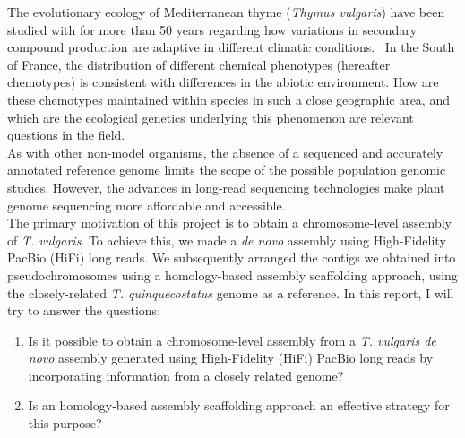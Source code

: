 The evolutionary ecology of Mediterranean thyme (\textit{Thymus vulgaris}) have been studied with for more than 50 years regarding how variations in secondary compound production are adaptive in different climatic conditions.~\cite{thompsonPlantTraitsEcological2020} In the South of France, the distribution of different chemical phenotypes (hereafter chemotypes) is consistent with differences in the abiotic environment. How are these chemotypes maintained within species in such a close geographic area, and which are the ecological genetics underlying this phenomenon are relevant questions in the field.~\cite{bataillonGenotypePhenotypeGenetic2022}\\

As with other non-model organisms, the absence of a sequenced and accurately annotated reference genome limits the scope of the possible population genomic studies. However, the advances in long-read sequencing technologies make plant genome sequencing more affordable and accessible.~\cite{puckerPlantGenomeSequence2022} \\

The primary motivation of this project is to obtain a chromosome-level assembly of \textit{T. vulgaris}. To achieve this, we made a \textit{de novo} assembly using High-Fidelity PacBio (\ac{HiFi}) long reads. We subsequently arranged the contigs we obtained into pseudochromosomes using a homology-based assembly scaffolding approach, using the closely-related \textit{T. quinquecostatus} genome as a reference. In this report, I will try to answer the questions:

\begin{enumerate}
    \item Is it possible to obtain a chromosome-level assembly from a  \textit{T. vulgaris de novo} assembly generated using High-Fidelity (HiFi) PacBio long reads by incorporating information from a closely related genome?
    \item Is an homology-based assembly scaffolding approach an effective strategy for this purpose?
\end{enumerate}

